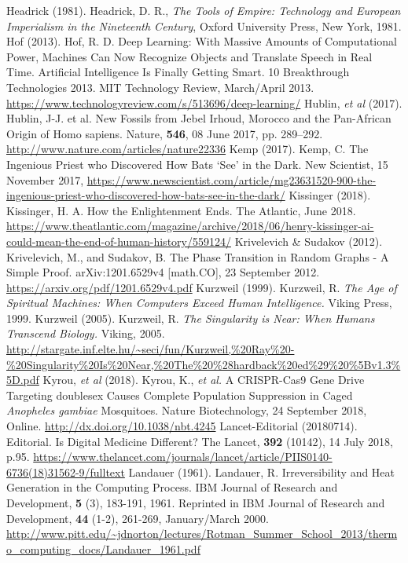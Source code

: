 \begin{multicols}{2}
\begin{thebibliography}{99}
 Headrick (1981). Headrick, D. R., \textit{The Tools of Empire: Technology and European Imperialism in the Nineteenth Century}, Oxford University Press, New York, 1981.
 Hof (2013). Hof, R. D. Deep Learning: With Massive Amounts of Computational Power, Machines Can Now Recognize Objects and Translate Speech in Real Time. Artificial Intelligence Is Finally Getting Smart. 10 Breakthrough Technologies 2013. MIT Technology Review, March/April 2013. \url{https://www.technologyreview.com/s/513696/deep-learning/}
 Hublin, \textit{et al} (2017). Hublin, J-J. et al. New Fossils from Jebel Irhoud, Morocco and the Pan-African Origin of Homo sapiens. Nature, \textbf{546}, 08 June 2017, pp. 289--292. \url{http://www.nature.com/articles/nature22336}
 Kemp (2017). Kemp, C. The Ingenious Priest who Discovered How Bats ‘See’ in the Dark. New Scientist, 15 November 2017, \url{https://www.newscientist.com/article/mg23631520-900-the-ingenious-priest-who-discovered-how-bats-see-in-the-dark/}
 Kissinger (2018). Kissinger, H. A. How the Enlightenment Ends. The Atlantic, June 2018. \url{https://www.theatlantic.com/magazine/archive/2018/06/henry-kissinger-ai-could-mean-the-end-of-human-history/559124/}
 Krivelevich \& Sudakov (2012). Krivelevich, M., and Sudakov, B. The Phase Transition in Random Graphs - A Simple Proof. arXiv:1201.6529v4 [math.CO], 23 September 2012. \url{https://arxiv.org/pdf/1201.6529v4.pdf}
 Kurzweil (1999). Kurzweil, R. \textit{The Age of Spiritual Machines: When Computers Exceed Human Intelligence.} Viking Press, 1999.
 Kurzweil (2005). Kurzweil, R. \textit{The Singularity is Near: When Humans Transcend Biology.} Viking, 2005. \url{http://stargate.inf.elte.hu/~seci/fun/Kurzweil,%20Ray%20-%20Singularity%20Is%20Near,%20The%20%28hardback%20ed%29%20%5Bv1.3%5D.pdf}
 Kyrou, \textit{et al} (2018). Kyrou, K., \textit{et al.} A CRISPR-Cas9 Gene Drive Targeting doublesex Causes Complete Population Suppression in Caged \textit{Anopheles gambiae} Mosquitoes. Nature Biotechnology, 24 September 2018, Online. \url{http://dx.doi.org/10.1038/nbt.4245}
 Lancet-Editorial (20180714). Editorial. Is Digital Medicine Different? The Lancet, \textbf{392} (10142), 14 July 2018, p.95. \url{https://www.thelancet.com/journals/lancet/article/PIIS0140-6736(18)31562-9/fulltext}
 Landauer (1961). Landauer, R. Irreversibility and Heat Generation in the Computing Process. IBM Journal of Research and Development, \textbf{5} (3), 183-191, 1961. Reprinted in IBM Journal of Research and Development, \textbf{44} (1-2), 261-269, January/March 2000. \url{http://www.pitt.edu/~jdnorton/lectures/Rotman_Summer_School_2013/thermo_computing_docs/Landauer_1961.pdf}

\end{thebibliography}
\end{multicols}
